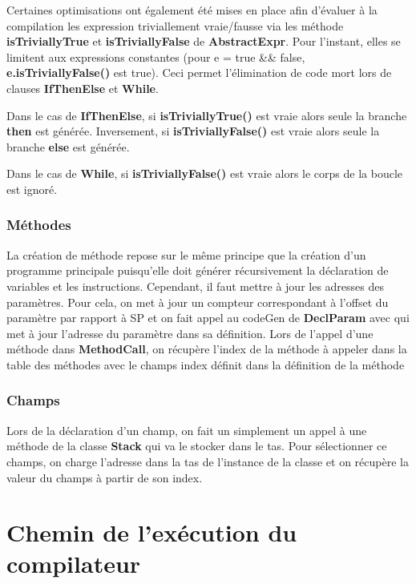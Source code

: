 \documentclass[12pt, a4paper, one side]{article}
\begin{document}
    Certaines optimisations ont également été mises en place afin d'évaluer à la compilation les expression triviallement vraie/fausse via les méthode \textbf{isTriviallyTrue} et \textbf{isTriviallyFalse} de \textbf{AbstractExpr}. Pour l'instant, elles se limitent aux expressions constantes (pour e = true && false, \textbf{e.isTriviallyFalse()} est true).
    Ceci permet l'élimination de code mort lors de clauses \textbf{IfThenElse} et \textbf{While}.

    Dans le cas de \textbf{IfThenElse}, si \textbf{isTriviallyTrue()} est vraie alors seule la branche \textbf{then} est générée. Inversement, si \textbf{isTriviallyFalse()} est vraie alors seule la branche \textbf{else} est générée.

    Dans le cas de \textbf{While}, si \textbf{isTriviallyFalse()} est vraie alors le corps de la boucle est ignoré.


    \subsubsection{Méthodes}

    La création de méthode repose sur le même principe que la création d'un
    programme principale puisqu'elle doit générer récursivement la déclaration
    de variables et les instructions. Cependant, il faut mettre à jour les
    adresses des paramètres. Pour cela, on met à jour un compteur correspondant
    à l'offset du paramètre par rapport à SP et on fait appel au codeGen de
    \textbf{DeclParam} avec qui met à jour l'adresse du paramètre dans sa
    définition.
    Lors de l'appel d'une méthode dans \textbf{MethodCall}, on récupère l'index
    de la méthode à appeler dans la table des méthodes avec le champs index
    définit dans la définition de la méthode

    \subsubsection{Champs}

    Lors de la déclaration d'un champ, on fait un simplement un appel à une
    méthode de la classe \textbf{Stack} qui va le stocker dans le tas. Pour
    sélectionner ce champs, on charge l'adresse dans la tas de l'instance de
    la classe et on récupère la valeur du champs à partir de son index.

    \newpage

    \section{Chemin de l'exécution du compilateur}
\end{document}
